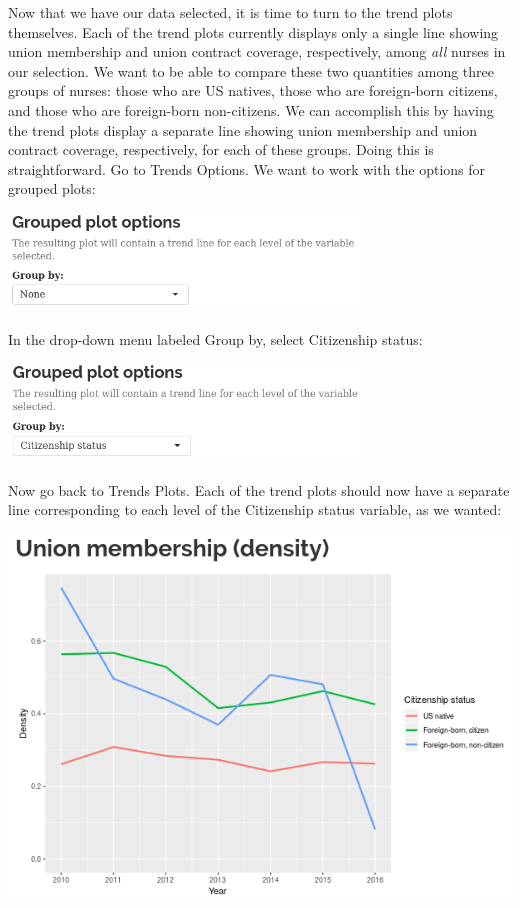 \documentclass[letterpaper,12pt]{article}
\begin{document}
\begin{enumerate}
  Now that we have our data selected, it is time to turn to the trend
  plots themselves. Each of the trend plots currently displays only a
  single line showing union membership and union contract coverage,
  respectively, among \emph{all} nurses in our selection. We want to
  be able to compare these two quantities among three groups of
  nurses: those who are US natives, those who are foreign-born
  citizens, and those who are foreign-born non-citizens. We can
  accomplish this by having the trend plots display a separate line
  showing union membership and union contract coverage, respectively,
  for each of these groups. Doing this is straightforward. Go to
  Trends \textrightarrow{} Options. We want to work with the options
  for grouped plots:
  \begin{center}
    \includegraphics[width=0.7\textwidth]{images/trends_ex3/grouped_plot_options.png}
  \end{center}
  In the drop-down menu labeled Group by, select Citizenship status:
  \begin{center}
    \includegraphics[width=0.7\textwidth]{images/trends_ex3/grouped_plot_options2.png}
  \end{center}
  Now go back to Trends \textrightarrow{} Plots. Each of the trend
  plots should now have a separate line corresponding to each level of
  the Citizenship status variable, as we wanted:
  \begin{center}
    \includegraphics[width=0.49\linewidth]{images/trends_ex3/membership_trend.png}

\end{center}
\end{enumerate}
\end{document}
